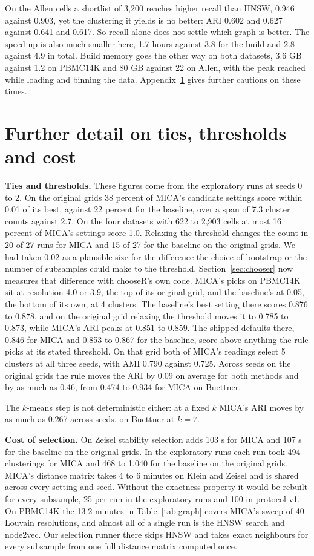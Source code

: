 On the Allen cells a shortlist of 3,200 reaches higher recall than HNSW, 0.946 against 0.903, yet the clustering it yields is no
better: ARI 0.602 and 0.627 against 0.641 and 0.617. So recall alone does not settle which graph is better. The speed-up is also much
smaller here, 1.7 hours against 3.8 for the build and 2.8 against 4.9 in total. Build memory goes the other way on both datasets, 3.6 GB
against 1.2 on PBMC14K and 80 GB against 22 on Allen, with the peak reached while loading and binning the data. Appendix~\ref{app:cost} gives further
cautions on these times.

\section{Further detail on ties, thresholds and cost}\label{app:cost}
\textbf{Ties and thresholds.} These figures come from the exploratory runs at seeds 0 to 2. On the original grids 38 percent of MICA's candidate settings score
within 0.01 of its best, against 22 percent for the baseline, over a span of 7.3 cluster counts against
2.7. On the four datasets with 622 to 2,903 cells at most 16 percent of MICA's settings score 1.0.
Relaxing the threshold changes the count in 20 of 27 runs for MICA and 15 of 27 for the baseline on the
original grids. We had taken 0.02 as a plausible size for the difference the choice of bootstrap or the number
of subsamples could make to the threshold. Section~\ref{sec:chooser} now measures that difference with
chooseR's own code. MICA's picks on PBMC14K sit at resolution
4.0 or 3.9, the top of its original grid, and the baseline's at 0.05, the bottom of its own, at 4 clusters.
The baseline's best setting there scores 0.876 to 0.878, and on the original grid relaxing the threshold
moves it to 0.785 to 0.873, while MICA's ARI peaks at 0.851 to 0.859. The shipped defaults there, 0.846 for MICA and 0.853 to 0.867 for the baseline, score above anything the rule picks at its stated threshold. On that grid both of MICA's readings
select 5 clusters at all three seeds, with AMI 0.790 against 0.725. Across seeds on the original grids the rule
moves the ARI by 0.09 on average for both methods and by as much as 0.46, from 0.474 to 0.934 for MICA on Buettner.

The $k$-means step is not deterministic either: at a fixed $k$ MICA's ARI moves by as much as 0.267 across seeds, on
Buettner at $k=7$.

\textbf{Cost of selection.} On Zeisel stability selection adds 103 s for MICA and 107 s for the baseline on the
original grids. In the exploratory runs each run took 494 clusterings for MICA and 468 to 1,040 for the baseline on the
original grids. MICA's distance matrix takes 4 to 6 minutes on Klein and Zeisel and is
shared across every setting and seed. Without the exactness property it would be rebuilt for every subsample, 25 per run in the exploratory runs and 100 in protocol v1. On PBMC14K the 13.2 minutes in Table~\ref{tab:graph} covers MICA's sweep of 40 Louvain
resolutions, and almost all of a single run is the HNSW search and node2vec. Our selection runner there skips
HNSW and takes exact neighbours for every subsample from one full distance matrix computed once.

